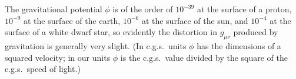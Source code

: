 The gravitational potential $\phi$ is of the order of $10^{-39}$ at the
surface of a proton, $10^{-9}$ at the surface of the earth, $10^{-6}$ at the
surface of the sun, and $10^{-4}$ at the surface of a white dwarf star, so
evidently the distortion in $g_{\mu\nu}$ produced by gravitation is
generally very slight. (In c.g.s.\ units $\phi$ has the dimensions of a
squared velocity; in our units $\phi$ is the c.g.s.\ value divided by the
square of the c.g.s.\ speed of light.)
